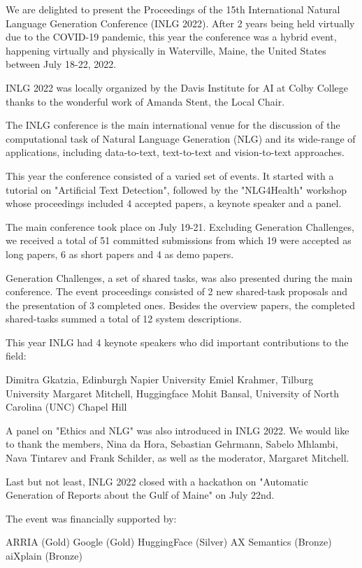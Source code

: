 We are delighted to present the Proceedings of the 15th International Natural Language Generation Conference (INLG 2022). After 2 years being held virtually due to the COVID-19 pandemic, this year the conference was a hybrid event, happening virtually and physically in Waterville, Maine, the United States between July 18-22, 2022.

INLG 2022 was locally organized by the Davis Institute for AI at Colby College thanks to the wonderful work of Amanda Stent, the Local Chair.

The INLG conference is the main international venue for the discussion of the computational task of Natural Language Generation (NLG) and its wide-range of applications, including data-to-text, text-to-text and vision-to-text approaches. 

This year the conference consisted of a varied set of events. It started with a tutorial on "Artificial Text Detection", followed by the "NLG4Health" workshop whose proceedings included 4 accepted papers, a keynote speaker and a panel.

The main conference took place on July 19-21. Excluding Generation Challenges, we received a total of 51 committed submissions from which 19 were accepted as long papers, 6 as short papers and 4 as demo papers.

Generation Challenges, a set of shared tasks, was also presented during the main conference. The event proceedings consisted of 2 new shared-task proposals and the presentation of 3 completed ones. Besides the overview papers, the completed shared-tasks summed a total of 12 system descriptions.

This year INLG had 4 keynote speakers who did important contributions to the field:

Dimitra Gkatzia, Edinburgh Napier University
Emiel Krahmer, Tilburg University
Margaret Mitchell, Huggingface
Mohit Bansal, University of North Carolina (UNC) Chapel Hill

A panel on "Ethics and NLG" was also introduced in INLG 2022. We would like to thank the members, Nina da Hora, Sebastian Gehrmann, Sabelo Mhlambi, Nava Tintarev and Frank Schilder, as well as the moderator, Margaret Mitchell.

Last but not least, INLG 2022 closed with a hackathon on "Automatic Generation of Reports about the Gulf of Maine" on July 22nd.

The event was financially supported by:

ARRIA (Gold)
Google (Gold)
HuggingFace (Silver)
AX Semantics (Bronze)
aiXplain (Bronze)

